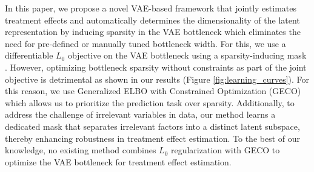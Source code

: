 \documentclass[doubleblind]{ecai}
\begin{document}

	
	
	
	In this paper, we propose a novel VAE-based framework that jointly estimates treatment effects and automatically determines the dimensionality of the latent representation by inducing sparsity in the VAE bottleneck which eliminates the need for pre-defined or manually tuned bottleneck width. For this, we use a differentiable $L_0$ objective on the VAE bottleneck using a sparsity-inducing mask \citep{louizos2018learning}.
	However, optimizing bottleneck sparsity without constraints as part of the joint objective is detrimental as shown in our results (Figure \ref{fig:learning_curves}). For this reason, we use Generalized ELBO with Constrained Optimization (GECO) \citep{JimenezRezende2018TamingV,Boom2020DynamicNO} which allows us to prioritize the prediction task over sparsity.
	Additionally, to address the challenge of irrelevant variables in data, our method learns a dedicated mask that separates irrelevant factors into a distinct latent subspace, thereby enhancing robustness in treatment effect estimation.
	To the best of our knowledge, no existing method combines $L_0$ regularization with GECO to optimize the VAE bottleneck for treatment effect estimation. 
	
\end{document}
